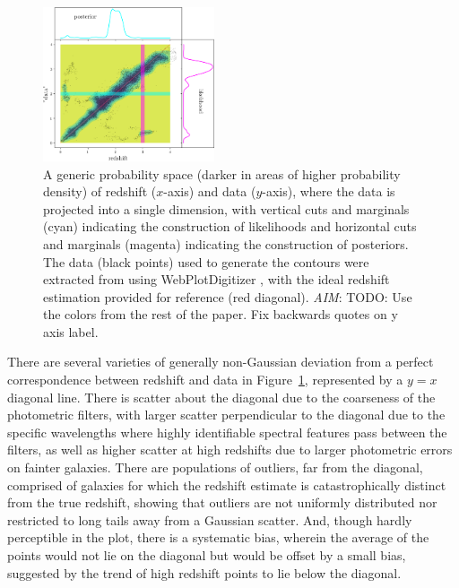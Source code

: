 \documentclass[iop]{emulateapj}
\newcommand{\todo}[3]{{\color{#2}\emph{#1}: #3}}
\newcommand{\aim}[1]{\todo{AIM}{red}{#1}}
\begin{document}
\begin{figure}
	\begin{center}
		\includegraphics[width=0.45\textwidth]{figures/jain05.png}
		\caption{
			A generic probability space (darker in areas of higher probability density) of redshift ($x$-axis) and data ($y$-axis), where the data is projected into a single dimension, with vertical cuts and marginals (cyan) indicating the construction of likelihoods and horizontal cuts and marginals (magenta) indicating the construction of posteriors.
			The data (black points) used to generate the contours were extracted from \citet{jain_whole_2015} using WebPlotDigitizer \citep{rohatgi_webplotdigitizer_2019}, with the ideal redshift estimation provided for reference (red diagonal).
			\aim{TODO: Use the colors from the rest of the paper.  
			Fix backwards quotes on y axis label.}
		}
		\label{fig:pedagogical_scatter}
	\end{center}
\end{figure}

There are several varieties of generally non-Gaussian deviation from a perfect correspondence between redshift and data in Figure~\ref{fig:pedagogical_scatter}, represented by a $y = x$ diagonal line.
There is scatter about the diagonal due to the coarseness of the photometric filters, with larger scatter perpendicular to the diagonal due to the specific wavelengths where highly identifiable spectral features pass between the filters, as well as higher scatter at high redshifts due to larger photometric errors on fainter galaxies.
There are populations of outliers, far from the diagonal, comprised of galaxies for which the redshift estimate is catastrophically distinct from the true redshift, showing that outliers are not uniformly distributed nor restricted to long tails away from a Gaussian scatter.
And, though hardly perceptible in the plot, there is a systematic bias, wherein the average of the points would not lie on the diagonal but would be offset by a small bias, suggested by the trend of high redshift points to lie below the diagonal.
\end{document}
